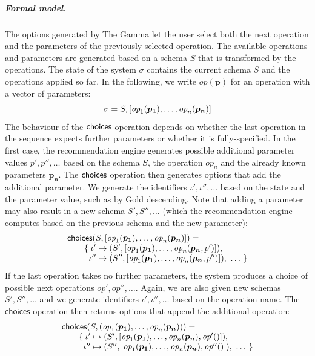 \documentclass[anonymous, a4paper,UKenglish,cleveref, autoref, thm-restate]{lipics-v2021}
\newcommand{\ident}[1]{\textsf{#1}}
\newcommand{\ddident}[1]{\guillemotleft\ident{#1}\guillemotright}
\newcommand{\choices}{\textnormal{\ident{choices}}}
\newcommand{\op}{\textit{op}}
\newcommand{\vect}[1]{\lbrack #1 \rbrack}
\begin{document}
\subparagraph{Formal model.}
The options generated by The Gamma let the user select both the next operation and the parameters
of the previously selected operation. The available operations and parameters are generated
based on a schema $S$ that is transformed by the operations. The state of the system $\sigma$
contains the current schema $S$ and the operations applied so far. In the following, we write
$\op(\boldsymbol{p})$ for an operation with a vector of parameters:
\[
\sigma = S, \vect{\op_1(\boldsymbol{p_1}), \ldots, \op_n(\boldsymbol{p_n})}\\
\]
The behaviour of the $\choices$ operation depends on whether the last operation in the sequence
expects further parameters or whether it is fully-specified. In the first case, the recommendation
engine generates possible additional parameter values $p', p'', \ldots$ based on the schema $S$,
the operation $\op_n$ and the already known parameters $\boldsymbol{p_n}$.
The $\choices$ operation then generates options that add the additional parameter. We generate the
identifiers $\iota',\iota'',\ldots$ based on the state and the parameter value, such as
\ddident{by Gold descending}. Note that adding a parameter may also result in a new schema
$S', S'', \ldots$ (which the recommendation engine computes based on the previous schema and the new parameter):
\[
\begin{array}{l}
\choices(S, \vect{\op_1(\boldsymbol{p_1}), \ldots, \op_n(\boldsymbol{p_n})}) =\\
\qquad \{\; \iota' \mapsto (S', \vect{\op_1(\boldsymbol{p_1}), \ldots, \op_n(\boldsymbol{p_n},p')}), \\
\qquad\;\;    \iota'' \mapsto (S'', \vect{\op_1(\boldsymbol{p_1}), \ldots, \op_n(\boldsymbol{p_n},p'')}), ~\ldots~\}
\end{array}
\]
If the last operation takes no further parameters, the system produces a choice
of possible next operations $\op', \op'', \ldots$. Again, we are also given new schemas $S', S'', \ldots$
and we generate identifiers $\iota',\iota'',\ldots$ based on the operation name. The $\ident{choices}$
operation then returns options that append the additional operation:
\[
\begin{array}{l}
\choices(S, (\op_1(\boldsymbol{p_1}), \ldots, \op_n(\boldsymbol{p_n}))) =\\
\qquad \{\; \iota' \mapsto (S', \vect{\op_1(\boldsymbol{p_1}), \ldots, \op_n(\boldsymbol{p_n}), \op'()}), \\
\qquad \;\; \iota'' \mapsto (S'', \vect{\op_1(\boldsymbol{p_1}), \ldots, \op_n(\boldsymbol{p_n}), \op''()}), ~\ldots~\}
\end{array}
\]
\end{document}
